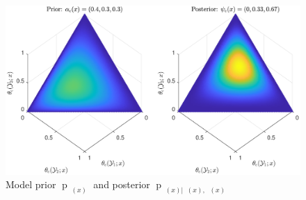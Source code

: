 \documentclass{article}
\DeclareMathOperator{\xrm}{\mathrm{x}}
\DeclareMathOperator{\yrm}{\mathrm{y}}
\DeclareMathOperator{\Drm}{\mathrm{D}}
\DeclareMathOperator{\Prm}{\mathrm{P}}
\DeclareMathOperator{\prm}{\mathrm{p}}
\DeclareMathOperator{\upthetac}{\uptheta_\text{c}}
\DeclareMathOperator{\psim}{\psi_\text{m}}
\DeclareMathOperator{\uppsim}{\uppsi_\text{m}}
\DeclareMathOperator{\uppsic}{\uppsi_\text{c}}
\DeclareMathOperator{\alpham}{\alpha_\text{m}}
\DeclareMathOperator{\alphac}{\alpha_\text{c}}
\begin{document}
\begin{figure}
	\centering
	\includegraphics[width=1\linewidth]{P_theta_post_SSP.pdf}
	\caption{Model prior $\prm_{\upthetac(x)}$ and posterior $\prm_{\upthetac(x) | \uppsim(x),\uppsic(x)}$}
	\label{fig:P_theta_post_tilde}
\end{figure}



%
\end{document}
